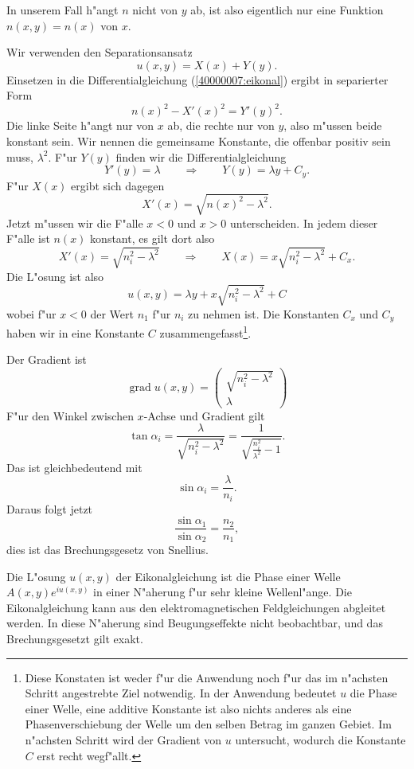 \begin{loesung}
In unserem Fall h"angt $n$ nicht von $y$ ab, ist also eigentlich
nur eine Funktion $n(x,y)=n(x)$ von $x$.
\begin{teilaufgaben}
\item
Wir verwenden den Separationsansatz
\[
u(x,y)=X(x) + Y(y).
\]
Einsetzen in die Differentialgleichung
(\ref{40000007:eikonal}) ergibt in separierter Form
\[
n(x)^2-X'(x)^2=Y'(y)^2.
\]
Die linke Seite h"angt nur von $x$ ab, die rechte nur von $y$,
also m"ussen beide konstant sein.
Wir nennen die gemeinsame Konstante, die offenbar positiv sein
muss, $\lambda^2$.
F"ur $Y(y)$ finden wir die Differentialgleichung
\[
Y'(y)=\lambda \qquad\Rightarrow\qquad Y(y)=\lambda y+ C_y.
\]
F"ur $X(x)$ ergibt sich dagegen
\[
X'(x)=\sqrt{n(x)^2-\lambda^2}.
\]
Jetzt m"ussen wir die F"alle $x<0$ und $x>0$ unterscheiden.
In jedem dieser F"alle ist $n(x)$ konstant, es gilt dort
also
\[
X'(x)=\sqrt{n_i^2-\lambda^2}
\qquad
\Rightarrow
\qquad
X(x)=x\sqrt{n_i^2-\lambda^2} + C_x.
\]
Die L"osung ist also
\[
u(x,y)=\lambda y + x\sqrt{n_i^2-\lambda^2} + C
\]
wobei f"ur $x<0$ der Wert $n_1$ f"ur $n_i$ zu nehmen ist.
Die Konstanten $C_x$ und $C_y$ haben wir in eine Konstante $C$
zusammengefasst\footnote{Diese Konstaten ist weder f"ur die Anwendung noch
f"ur das im n"achsten Schritt angestrebte Ziel notwendig. In der Anwendung
bedeutet $u$ die Phase einer Welle, eine additive Konstante ist also nichts
anderes als eine Phasenverschiebung der Welle um den selben Betrag
im ganzen Gebiet. Im n"achsten Schritt wird der Gradient von $u$ untersucht,
wodurch die Konstante $C$ erst recht wegf"allt.}.
\item
Der Gradient ist
\[
\operatorname{grad}u(x,y)
=
\begin{pmatrix}
\sqrt{n_i^2-\lambda^2}\\
\lambda
\end{pmatrix}
\]
F"ur den Winkel zwischen $x$-Achse und Gradient gilt
\[
\tan\alpha_i
=
\frac{\lambda}{\sqrt{n_i^2-\lambda^2}}
=
\frac1{\sqrt{\frac{n_i^2}{\lambda^2}-1}}.
\]
Das ist gleichbedeutend mit
\[
\sin\alpha_i=\frac{\lambda}{n_i}.
\]
Daraus folgt jetzt
\[
\frac{ \sin\alpha_1}{\sin\alpha_2}=\frac{n_2}{n_1},
\]
dies ist das Brechungsgesetz von Snellius.
\qedhere
\end{teilaufgaben}
\end{loesung}

\begin{diskussion}
Die L"osung $u(x,y)$ der Eikonalgleichung ist die Phase einer Welle
$A(x,y)e^{iu(x,y)}$ in einer N"aherung f"ur sehr kleine Wellenl"ange.
Die Eikonalgleichung kann aus den elektromagnetischen Feldgleichungen
abgleitet werden.
In diese N"aherung sind Beugungseffekte nicht beobachtbar, und das
Brechungsgesetzt gilt exakt.
\end{diskussion}
